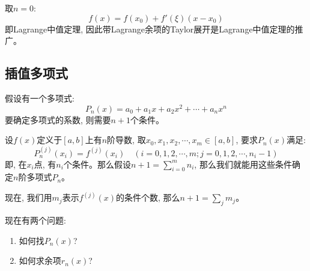 \begin{remark}
    取$n = 0$:
    \begin{equation*}
        f(x) = f(x_0) + f'(\xi)(x - x_0)
    \end{equation*}
    即Lagrange中值定理, 因此带Lagrange余项的Taylor展开是Lagrange中值定理的推广。
\end{remark}

\subsection{插值多项式}
假设有一个多项式:
\begin{equation*}
    P_n(x) = a_0 + a_1x + a_2x^2 + \cdots + a_nx^n
\end{equation*}
要确定多项式的系数, 则需要$n+1$个条件。

设$f(x)$定义于$[a, b]$上有$n$阶导数, 取$x_0, x_1, x_2, \cdots, x_m \in [a, b]$, 要求$P_n(x)$满足:
\begin{equation*}
    P_n^{(j)}(x_i) = f^{(j)}(x_i) \quad (i = 0, 1, 2, \cdots, m; j = 0, 1, 2, \cdots, n_i-1)
\end{equation*}
即, 在$x_i$点, 有$n_i$个条件。那么假设$n+1 = \sum_{i = 0}^m n_i$, 那么我们就能用这些条件确定$n$阶多项式$P_n$。

现在, 我们用$m_j$表示$f^{(j)}(x)$的条件个数, 那么$n+1 = \sum_{j} m_j$。


现在有两个问题:
\begin{enumerate}
    \item 如何找$P_n(x)$?
    \item 如何求余项$r_n(x)$?
\end{enumerate}
